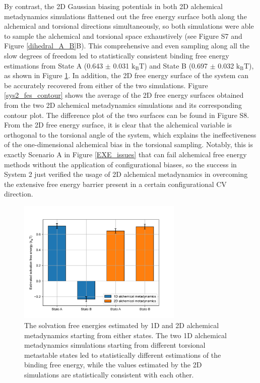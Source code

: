 \documentclass[journal=jacsat,manuscript=article]{achemso}
\begin{document}
By contrast, the 2D Gaussian biasing potentials in both 2D alchemical metadynamics simulations flattened out the free energy surface both along the alchemical and torsional directions simultaneously, so both simulations were able to sample the alchemical and torsional space exhaustively (see Figure S7 and Figure \ref{dihedral_A_B}B). This comprehensive and even sampling along all the slow degrees of freedom led to statistically consistent binding free energy estimations from State A (0.643 $\pm$ 0.031 $\text{k}_{\text{B}}\text{T}$) and State B (0.697 $\pm$ 0.032 $\text{k}_{\text{B}}\text{T}$), as shown in Figure \ref{sys2_df_results}. In addition, the 2D free energy surface of the system can be accurately recovered from either of the two simulations. Figure \ref{sys2_fes_contour} shows the average of the 2D free energy surfaces obtained from the two 2D alchemical metadynamics simulations and its corresponding contour plot. The difference plot of the two surfaces can be found in Figure S8. From the 2D free energy surface, it is clear that the alchemical variable is orthogonal to the torsional angle of the system, which explains the ineffectiveness of the one-dimensional alchemical bias in the torsional sampling. Notably, this is exactly Scenario A in Figure \ref{EXE_issues} that can fail alchemical free energy methods without the application of configurational biases, so the success in System 2 just verified the usage of 2D alchemical metadynamics in overcoming the extensive free energy barrier present in a certain configurational CV direction. 

\begin{figure}[H]
    \centering
    \includegraphics[width=0.7\textwidth]{Figures/sys2_df_results.png}
    \caption{The solvation free energies estimated by 1D and 2D alchemical metadynamics starting from either states. The two 1D alchemical metadynamics simulations starting from different torsional metastable states led to statistically different estimations of the binding free energy, while the values estimated by the 2D simulations are statistically consistent with each other.}
    \label{sys2_df_results}
\end{figure}
\end{document}
